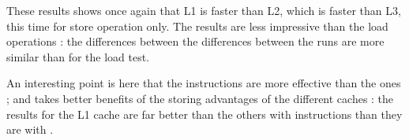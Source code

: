 
These results shows once again that L1 is faster than L2, which is faster than L3, this time for store operation only.
The results are less impressive than the load operations : the differences between the differences between the runs are more similar than for the load test.

An interesting point is here that the  instructions are more effective than the  ones ; and takes better benefits of the storing advantages of the different caches : the results for the L1 cache are far better than the others with  instructions than they are with .